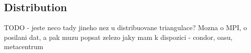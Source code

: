 \subsection{Distribution}
TODO - jeste neco tady jineho nez u distribuovane triangulace? Mozna o MPI, o posilani dat, a pak muzu popsat zelezo jaky mam k dispozici - condor, oasu, metacentrum
